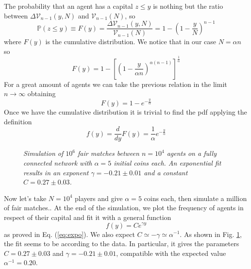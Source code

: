The probability that an agent has a capital $z \leq y$ is nothing but the ratio between $\Delta\mathcal{V}_{n-1}\left(y, N\right)$ and $\mathcal{V}_{n-1}\left(N\right)$, so
\begin{equation*}
    \mathbb{P}\left(z \leq y\right) \equiv F(y) = \frac{\Delta\mathcal{V}_{n-1}\left(y, N\right)}{\mathcal{V}_{n-1}\left(N\right)} = 1 - \left(1 - \frac{y}{N}\right)^{n-1}
\end{equation*}
where $F(y)$ is the cumulative distribution.
We notice that in our case $N=\alpha n$ so
\begin{equation*}
    F(y) =  1 - \left[\left(1 - \frac{y}{\alpha n}\right)^{\alpha\left(n - 1\right)}\right]^\frac{1}{\alpha}
\end{equation*}
For a great amount of agents we can take the previous relation in the limit $n\to\infty$ obtaining
\begin{equation*}
    F(y) = 1 - e^{-\frac{y}{\alpha}}
\end{equation*}
Once we have the cumulative distribution it is trivial to find the pdf applying the definition
\begin{equation}
    f(y) = \frac{d}{dy}F(y) = \frac{1}{\alpha} e^{-\frac{y}{\alpha}}
    \label{eq:expo}
\end{equation}

\begin{figure}[ht!]
    \centering
    \scalebox{.7}{}
    \caption{\emph{Simulation of $10^6$ fair matches between $n = 10^4$ agents on a fully connected network with $\alpha = 5$ initial coins each. 
                    An exponential fit results in an exponent $\gamma = -0.21 \pm 0.01$ and a constant $C = 0.27 \pm 0.03$.}}
    \label{fig:expo}
\end{figure}
Now let's take $N = 10^4$ players and give $\alpha = 5$ coins each, then simulate a million of fair matches..
At the end of the simulation, we plot the frequency of agents in respect of their capital and fit \cite{root} it with a general function 
\begin{equation}
    f(y) = Ce^{\gamma y}
    \label{eq:generalExpo}
\end{equation}
as proved in Eq. (\ref{eq:expo}).
We  also expect $C \simeq -\gamma \simeq \alpha^{-1}$.
As shown in Fig. \ref{fig:expo}, the fit seems to be according to the data.
In particular, it gives the parameters $C = 0.27 \pm 0.03$ and $\gamma = -0.21 \pm 0.01$, compatible with the expected value $\alpha^{-1} = 0.20$.
